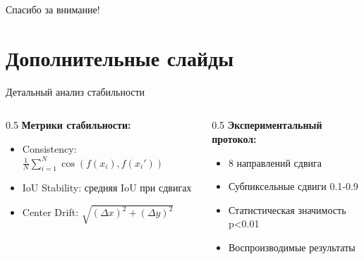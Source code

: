 \documentclass[aspectratio=169]{beamer}
\begin{document}
\begin{frame}
    \begin{center}
        \Huge Спасибо за внимание!
    \end{center}
\end{frame}

\section{Дополнительные слайды}

\begin{frame}{Детальный анализ стабильности}
    \begin{columns}
        \begin{column}{0.5\textwidth}
            \textbf{Метрики стабильности:}
            \begin{itemize}
                \item Consistency: $\frac{1}{N}\sum_{i=1}^N \cos(f(x_i), f(x_i'))$
                \item IoU Stability: средняя IoU при сдвигах
                \item Center Drift: $\sqrt{(\Delta x)^2 + (\Delta y)^2}$
            \end{itemize}
        \end{column}
        \begin{column}{0.5\textwidth}
            \textbf{Экспериментальный протокол:}
            \begin{itemize}
                \item 8 направлений сдвига
                \item Субпиксельные сдвиги 0.1-0.9
                \item Статистическая значимость p<0.01
                \item Воспроизводимые результаты
            \end{itemize}
        \end{column}
    \end{columns}
\end{frame}
\end{document}
